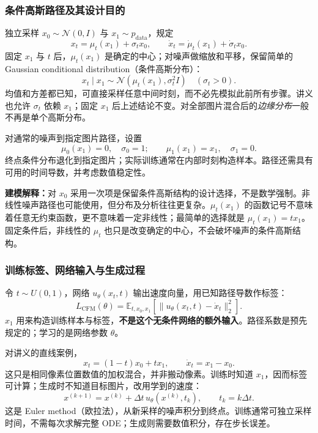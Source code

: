 

\subsubsection*{条件高斯路径及其设计目的}

独立采样 $x_0\sim\mathcal N(0,I)$ 与 $x_1\sim p_{\mathrm{data}}$，规定
\[
  \boxed{x_t=\mu_t(x_1)+\sigma_t x_0},\qquad
  \dot x_t=\dot\mu_t(x_1)+\dot\sigma_t x_0.
\]
固定 $x_1$ 与 $t$ 后，$\mu_t(x_1)$ 是确定的中心；对噪声做缩放和平移，保留简单的 Gaussian conditional distribution（条件高斯分布）：
\[
  x_t\mid x_1\sim\mathcal N\!\left(\mu_t(x_1),\sigma_t^2 I\right)
  \quad(\sigma_t>0).
\]
均值和方差都已知，可直接采样任意中间时刻，而不必先模拟此前所有步骤。讲义也允许 $\sigma_t$ 依赖 $x_1$；固定 $x_1$ 后上述结论不变。对全部图片混合后的\emph{边缘分布}一般不再是单个高斯分布。

对通常的噪声到指定图片路径，设置
\[
  \mu_0(x_1)=0,\quad\sigma_0=1;\qquad
  \mu_1(x_1)=x_1,\quad\sigma_1=0.
\]
终点条件分布退化到指定图片；实际训练通常在内部时刻构造样本。路径还需具有可用的时间导数，并考虑数值稳定性。

\textbf{建模解释：}对 $x_0$ 采用一次项是保留条件高斯结构的设计选择，不是数学强制。非线性噪声路径也可能使用，但分布及分析往往更复杂。$\mu_t(x_1)$ 的函数记号不意味着任意无约束函数，更不意味着一定非线性；最简单的选择就是 $\mu_t(x_1)=t x_1$。固定条件后，非线性的 $\mu_t$ 也只是改变确定的中心，不会破坏噪声的条件高斯结构。

\subsubsection*{训练标签、网络输入与生成过程}

令 $t\sim U(0,1)$，网络 $u_\theta(x_t,t)$ 输出速度向量，用已知路径导数作标签：
\[
  \boxed{L_{\mathrm{CFM}}(\theta)
    =\mathbb E_{t,x_0,x_1}
      \left[\|u_\theta(x_t,t)-\dot x_t\|_2^2\right]}.
\]
$x_1$ 用来构造训练样本与标签，\textbf{不是这个无条件网络的额外输入}。路径系数是预先规定的；学习的是网络参数 $\theta$。

对讲义的直线案例，
\[
  x_t=(1-t)x_0+t x_1,\qquad \dot x_t=x_1-x_0.
\]
这只是相同像素位置数值的加权混合，并非搬动像素。训练时知道 $x_1$，因而标签可计算；生成时不知道目标图片，改用学到的速度：
\[
  \boxed{x^{(k+1)}=x^{(k)}+\Delta t\,
    u_\theta(x^{(k)},t_k)},\qquad t_k=k\Delta t.
\]
这是 Euler method（欧拉法），从新采样的噪声积分到终点。训练通常可独立采样时间，不需每次求解完整 ODE；生成则需要数值积分，存在步长误差。

